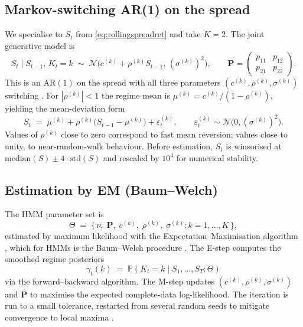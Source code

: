 \subsection{Markov-switching AR(1) on the spread}\label{sec:msarspread}

We specialise to $S_t$ from \eqref{eq:rollingspreadret} and take $K = 2$. The joint generative model is
\begin{equation}\label{eq:msargen}
    S_t \mid S_{t-1},\, K_t = k \;\sim\; \mathcal{N}\!\bigl(c^{(k)} + \rho^{(k)} S_{t-1},\, (\sigma^{(k)})^{2}\bigr),
    \qquad
    \mathbf{P} = \begin{pmatrix} p_{11} & p_{12} \\ p_{21} & p_{22} \end{pmatrix}.
\end{equation}
This is an $\mathrm{AR}(1)$ on the spread with all three parameters $(c^{(k)},\rho^{(k)},\sigma^{(k)})$ switching \parencite{hamilton1989new,krolzig1997msvar}. For $|\rho^{(k)}|<1$ the regime mean is $\mu^{(k)} = c^{(k)}/(1-\rho^{(k)})$, yielding the mean-deviation form
\begin{equation}\label{eq:meandevparam}
    S_t \;=\; \mu^{(k)} + \rho^{(k)}\bigl(S_{t-1} - \mu^{(k)}\bigr) + \varepsilon_t^{(k)},
    \qquad \varepsilon_t^{(k)} \sim \mathcal{N}\bigl(0,(\sigma^{(k)})^{2}\bigr).
\end{equation}
Values of $\rho^{(k)}$ close to zero correspond to fast mean reversion; values close to unity, to near-random-walk behaviour. Before estimation, $S_t$ is winsorised at $\mathrm{median}(S) \pm 4\cdot\mathrm{std}(S)$ and rescaled by $10^{4}$ for numerical stability.

\subsection{Estimation by EM (Baum--Welch)}\label{sec:em}

The HMM parameter set is
\begin{equation}\label{eq:thetadef}
    \Theta \;=\; \bigl\{\, \nu,\; \mathbf{P},\; c^{(k)},\; \rho^{(k)},\; \sigma^{(k)} : k=1,\ldots,K \,\bigr\},
\end{equation}
estimated by maximum likelihood with the Expectation--Maximisation algorithm \parencite{dempster1977}, which for HMMs is the Baum--Welch procedure \parencite{baum1970maximization,rabiner1989tutorial}. The E-step computes the smoothed regime posteriors
\begin{equation}\label{eq:smoothedposterior}
    \gamma_t(k) \;=\; \mathbb{P}(K_t = k \mid S_1,\ldots,S_T;\Theta)
\end{equation}
via the forward--backward algorithm. The M-step updates $(c^{(k)},\rho^{(k)},\sigma^{(k)})$ and $\mathbf{P}$ to maximise the expected complete-data log-likelihood. The iteration is run to a small tolerance, restarted from several random seeds to mitigate convergence to local maxima \parencite{cappe2005}.

